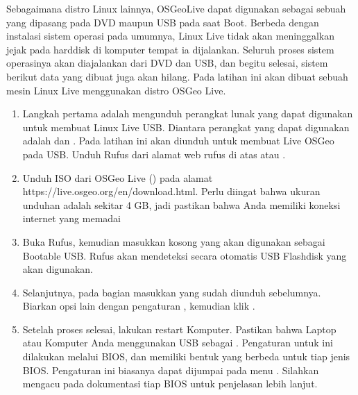 \documentclass[letterpaper,10pt,english]{sphinxmanual}
\let\sphinxpxdimen\pdfpxdimen\else\newdimen\sphinxpxdimen
\begin{document}
Sebagaimana distro Linux lainnya, OSGeoLive dapat digunakan sebagai sebuah  yang dipasang pada DVD maupun USB pada saat Boot. Berbeda dengan instalasi sistem operasi pada umumnya, Linux Live tidak akan meninggalkan jejak pada harddisk di komputer tempat ia dijalankan. Seluruh proses sistem operasinya akan diajalankan dari DVD dan USB, dan begitu selesai, sistem berikut data yang dibuat juga akan hilang. Pada latihan ini akan dibuat sebuah mesin Linux Live menggunakan distro OSGeo Live.
\begin{enumerate}
%
\item {} 
Langkah pertama adalah mengunduh perangkat lunak yang dapat digunakan untuk membuat Linux Live USB. Diantara perangkat yang dapat digunakan adalah  dan . Pada latihan ini akan diunduh  untuk membuat Live OSGeo pada USB. Unduh Rufus dari alamat web rufus di atas atau .

\item {} 
Unduh ISO dari OSGeo Live () pada alamat https://live.osgeo.org/en/download.html. Perlu diingat bahwa ukuran unduhan adalah sekitar 4 GB, jadi pastikan bahwa Anda memiliki koneksi internet yang memadai

\item {} 
Buka Rufus, kemudian masukkan  kosong yang akan digunakan sebagai Bootable USB. Rufus akan mendeteksi secara otomatis USB Flashdisk yang akan digunakan.

\item {} 
Selanjutnya, pada bagian  masukkan  yang sudah diunduh sebelumnya. Biarkan opsi lain dengan pengaturan , kemudian klik .

\begin{figure}[htbp]
\centering

\noindent\sphinxincludegraphics[height=350\sphinxpxdimen]{{2020-12-07-19-55-11}.png}
\end{figure}

\item {} 
Setelah proses selesai, lakukan restart Komputer. Pastikan bahwa Laptop atau Komputer Anda menggunakan USB sebagai . Pengaturan untuk ini dilakukan melalui BIOS, dan memiliki bentuk yang berbeda untuk tiap jenis BIOS. Pengaturan ini biasanya dapat dijumpai pada menu . Silahkan mengacu pada dokumentasi tiap BIOS untuk penjelasan lebih lanjut.


\end{enumerate}
\end{document}
